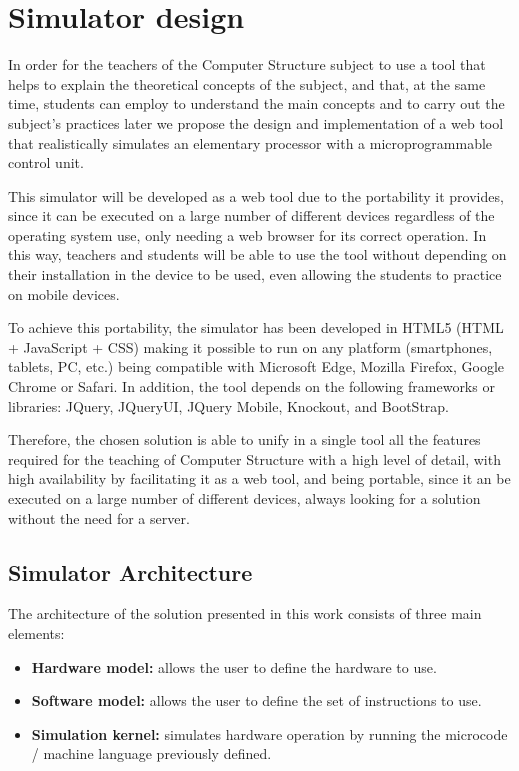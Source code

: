 \section*{Simulator design}

In order for the teachers of the Computer Structure subject to use a tool that helps to explain the theoretical concepts of the subject, and that, at the same time, students can employ to understand the main concepts and to carry out the subject's practices later we propose the design and implementation of a web tool that realistically simulates an elementary processor with a microprogrammable control unit.

This simulator will be developed as a web tool due to the portability it provides, since it can be executed on a large number of different devices regardless of the operating system use, only needing a web browser for its correct operation. In this way, teachers and students will be able to use the tool without depending on their installation in the device to be used, even allowing the students to practice on mobile devices.

To achieve this portability, the simulator has been developed in HTML5 (HTML + JavaScript + CSS) making it possible to run on any platform (smartphones, tablets, PC, etc.) being compatible with Microsoft Edge, Mozilla Firefox, Google Chrome or Safari. In addition, the tool depends on the following frameworks or libraries: JQuery, JQueryUI, JQuery Mobile, Knockout, and BootStrap.

Therefore, the chosen solution is able to unify in a single tool all the features required for the teaching of Computer Structure with a high level of detail, with high availability by facilitating it as a web tool, and being portable, since it an be executed on a large number of different devices, always looking for a solution without the need for a server.

\subsection*{Simulator Architecture}

The architecture of the solution presented in this work consists of three main elements:

\begin{itemize}
\item \textbf{Hardware model:} allows the user to define the hardware to use.
\item \textbf{Software model:} allows the user to define the set of instructions to use.
\item \textbf{Simulation kernel:} simulates hardware operation by running the microcode / machine language previously defined.
\end{itemize}

